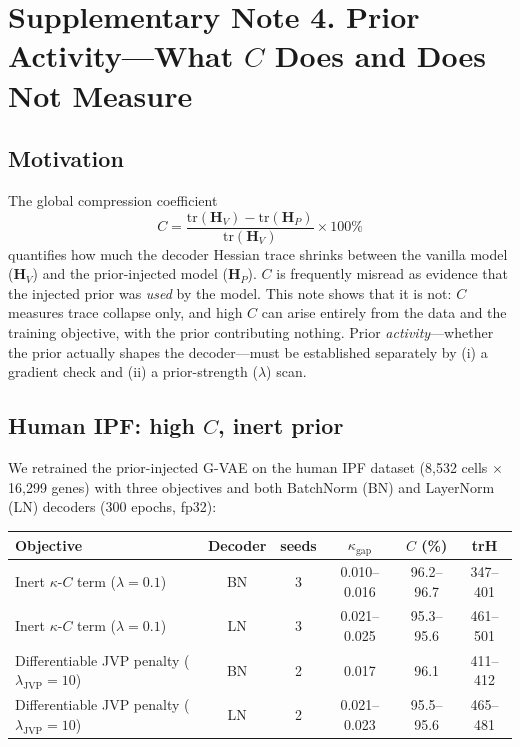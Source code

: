 \documentclass[11pt,a4paper]{article}
\begin{document}
\section*{Supplementary Note 4. Prior Activity---What $C$ Does and Does Not Measure}
\label{sup:prior_activity}

\subsection*{Motivation}

The global compression coefficient
\begin{equation}
C = \frac{\mathrm{tr}(\mathbf{H}_V) - \mathrm{tr}(\mathbf{H}_P)}{\mathrm{tr}(\mathbf{H}_V)} \times 100\%
\end{equation}
quantifies how much the decoder Hessian trace shrinks between the vanilla model ($\mathbf{H}_V$) and the prior-injected model ($\mathbf{H}_P$). $C$ is frequently misread as evidence that the injected prior was \emph{used} by the model. This note shows that it is not: $C$ measures trace collapse only, and high $C$ can arise entirely from the data and the training objective, with the prior contributing nothing. Prior \emph{activity}---whether the prior actually shapes the decoder---must be established separately by (i) a gradient check and (ii) a prior-strength ($\lambda$) scan.

\subsection*{Human IPF: high $C$, inert prior}

We retrained the prior-injected G-VAE on the human IPF dataset (8,532 cells $\times$ 16,299 genes) with three objectives and both BatchNorm (BN) and LayerNorm (LN) decoders (300 epochs, fp32):

\begin{center}
\begin{tabular}{lccccc}
\toprule
Objective & Decoder & seeds & $\kappa_{\mathrm{gap}}$ & $C$ (\%) & trH \\
\midrule
Inert $\kappa$-$C$ term ($\lambda=0.1$) & BN & 3 & 0.010--0.016 & 96.2--96.7 & 347--401 \\
Inert $\kappa$-$C$ term ($\lambda=0.1$) & LN & 3 & 0.021--0.025 & 95.3--95.6 & 461--501 \\
Differentiable JVP penalty ($\lambda_{\mathrm{JVP}}=10$) & BN & 2 & 0.017 & 96.1 & 411--412 \\
Differentiable JVP penalty ($\lambda_{\mathrm{JVP}}=10$) & LN & 2 & 0.021--0.023 & 95.5--95.6 & 465--481 \\
\bottomrule
\end{tabular}
\end{center}
\end{document}
